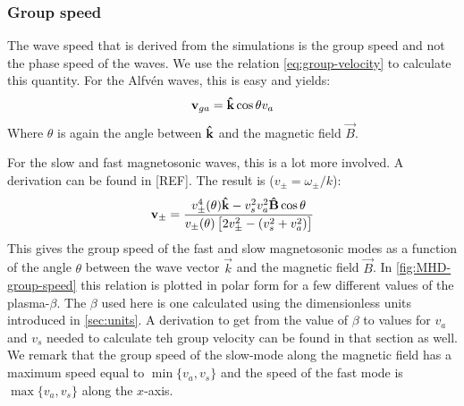 \subsubsection{Group speed}
The wave speed that is derived from the simulations is the group speed and not the phase speed of the waves. We use the relation \cref{eq:group-velocity} to calculate this quantity.
For the Alfvén waves, this is easy and yields:
\begin{equation}
	\mathbf{v}_{ga} = \mathbf{\hat{k}}\cos\theta v_a
\end{equation}
Where $\theta$ is again the angle between $\mathbf{\hat{k}}$ and the magnetic field $\vec{B}$.

For the slow and fast magnetosonic waves, this is a lot more involved. A derivation can be found in  [REF].
The result is ($v_\pm=\omega_\pm/k$):
\begin{equation}
	\mathbf{v}_\pm = \frac{v_\pm^4(\theta)\mathbf{\hat{k}} - v_s^2v_a^2\mathbf{\hat{B}}\cos\theta}{v_\pm(\theta) \left[ 2v_\pm^2-(v_s^2+v_a^2) \right]}
\end{equation}
This gives the group speed of the fast and slow magnetosonic modes as a function of the angle $\theta$ between the wave vector $\vec{k}$ and the magnetic field $\vec{B}$.
In \cref{fig:MHD-group-speed} this relation is plotted in polar form for a few different values of the plasma-$\beta$.
The $\beta$ used here is one calculated using the dimensionless units introduced in \cref{sec:units}. 
A derivation to get from the value of $\beta$ to values for $v_a$ and $v_s$ needed to calculate teh group velocity can be found in that section as well.
We remark that the group speed of the slow-mode along the magnetic field has a maximum speed equal to $\min\{v_a,v_s\}$ and the speed of the fast mode is $\max\{v_a,v_s\}$ along the $x$-axis.

